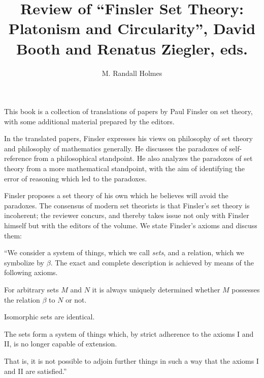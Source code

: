 
\title{Review of ``Finsler Set Theory:
Platonism and Circularity'', David Booth and Renatus Ziegler, eds.}

\author{M. Randall Holmes}


\maketitle
This book is a collection of translations of papers by Paul Finsler on
set theory, with some additional material prepared by the editors.

In the translated papers, Finsler expresses his views on philosophy of
set theory and philosophy of mathematics generally.  He discusses the
paradoxes of self-reference from a philosophical standpoint.  He also
analyzes the paradoxes of set theory from a more mathematical
standpoint, with the aim of identifying the error of reasoning which
led to the paradoxes.

Finsler proposes a set theory of his own which he believes will avoid
the paradoxes.  The consensus of modern set theorists is that
Finsler's set theory is incoherent; the reviewer concurs, and thereby
takes issue not only with Finsler himself but with the editors of the
volume.  We state Finsler's axioms and discuss them:


\begin{description}

\item ``We consider a system of things, which we call {\em sets\/}, and
a relation, which we symbolize by $\beta$. The exact and complete
description is achieved by means of the following axioms.

\item[I.  Axiom of Relation:] For arbitrary sets $M$ and $N$ it is
always uniquely determined whether $M$ possesses the relation $\beta$
to $N$ or not.

\item[II.  Axiom of Identity:]  Isomorphic sets are identical.

\item[III.  Axiom of Completeness:] The sets form a system of things
which, by strict adherence to the axioms I and II, is no longer
capable of extension.

That is, it is not possible to adjoin further things in such a way
that the axioms I and II are satisfied.''

\end{description}

